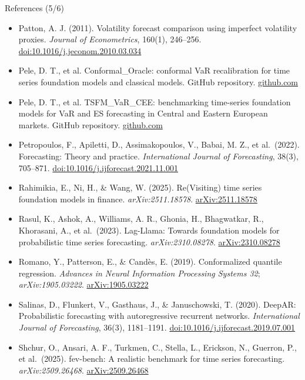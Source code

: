 \begin{frame}{References (5/6)}
\itemsize{\tiny}
\begin{itemize}
    \item Patton, A. J. (2011). Volatility forecast comparison using imperfect volatility proxies. \textit{Journal of Econometrics}, 160(1), 246--256. \href{https://doi.org/10.1016/j.jeconom.2010.03.034}{doi:10.1016/j.jeconom.2010.03.034}
    \item Pele, D. T., et al. Conformal\_Oracle: conformal VaR recalibration for time series foundation models and classical models. GitHub repository. \href{https://github.com/danpele/Conformal_Oracle}{github.com}
    \item Pele, D. T., et al. TSFM\_VaR\_CEE: benchmarking time-series foundation models for VaR and ES forecasting in Central and Eastern European markets. GitHub repository. \href{https://github.com/danpele/TSFM_VaR_CEE}{github.com}
    \item Petropoulos, F., Apiletti, D., Assimakopoulos, V., Babai, M. Z., et al.\ (2022). Forecasting: Theory and practice. \textit{International Journal of Forecasting}, 38(3), 705--871. \href{https://doi.org/10.1016/j.ijforecast.2021.11.001}{doi:10.1016/j.ijforecast.2021.11.001}
    \item Rahimikia, E., Ni, H., \& Wang, W. (2025). Re(Visiting) time series foundation models in finance. \textit{arXiv:2511.18578}. \href{https://arxiv.org/abs/2511.18578}{arXiv:2511.18578}
    \item Rasul, K., Ashok, A., Williams, A. R., Ghonia, H., Bhagwatkar, R., Khorasani, A., et al.\ (2023). Lag-Llama: Towards foundation models for probabilistic time series forecasting. \textit{arXiv:2310.08278}. \href{https://arxiv.org/abs/2310.08278}{arXiv:2310.08278}
    \item Romano, Y., Patterson, E., \& Candès, E. (2019). Conformalized quantile regression. \textit{Advances in Neural Information Processing Systems 32}; \textit{arXiv:1905.03222}. \href{https://arxiv.org/abs/1905.03222}{arXiv:1905.03222}
    \item Salinas, D., Flunkert, V., Gasthaus, J., \& Januschowski, T. (2020). DeepAR: Probabilistic forecasting with autoregressive recurrent networks. \textit{International Journal of Forecasting}, 36(3), 1181--1191. \href{https://doi.org/10.1016/j.ijforecast.2019.07.001}{doi:10.1016/j.ijforecast.2019.07.001}
    \item Shchur, O., Ansari, A. F., Turkmen, C., Stella, L., Erickson, N., Guerron, P., et al.\ (2025). fev-bench: A realistic benchmark for time series forecasting. \textit{arXiv:2509.26468}. \href{https://arxiv.org/abs/2509.26468}{arXiv:2509.26468}

\end{itemize}
\end{frame}
